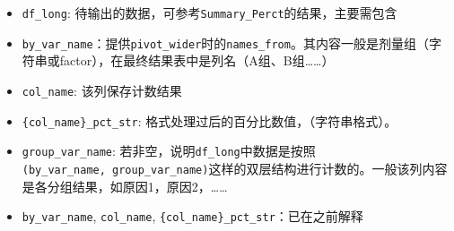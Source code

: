 \documentclass[
]{ctexart}
\begin{document}
\begin{itemize}
\item
  \texttt{df\_long}:
  待输出的数据，可参考\texttt{Summary\_Perct}的结果，主要需包含
\item
  \texttt{by\_var\_name}：提供\texttt{pivot\_wider}时的\texttt{names\_from}。其内容一般是剂量组（字符串或factor），在最终结果表中是列名（A组、B组\ldots\ldots）
\item
  \texttt{col\_name}: 该列保存计数结果
\item
  \texttt{\{col\_name\}\_pct\_str}:
  格式处理过后的百分比数值，（字符串格式）。
\item
  \texttt{group\_var\_name}:
  若非空，说明\texttt{df\_long}中数据是按照\texttt{(by\_var\_name,\ group\_var\_name)}这样的双层结构进行计数的。一般该列内容是各分组结果，如原因1，原因2，\ldots\ldots{}
\item
  \texttt{by\_var\_name}, \texttt{col\_name},
  \texttt{\{col\_name\}\_pct\_str}：已在之前解释
\end{itemize}
\end{document}
